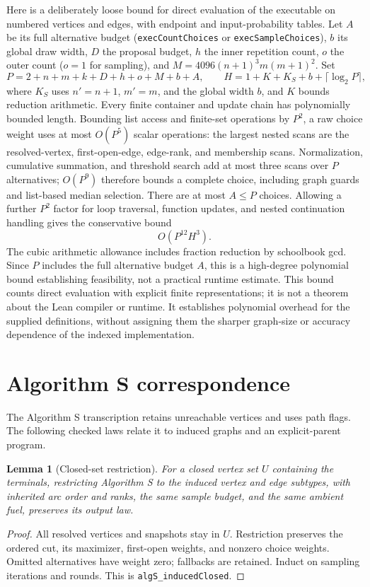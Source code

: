 \documentclass[11pt]{article}
\newtheorem{lemma}[theorem]{Lemma}
\begin{document}
Here is a deliberately loose bound for direct evaluation of the executable
on numbered vertices and edges, with endpoint and input-probability tables.
Let $A$ be its full alternative budget (\texttt{execCountChoices} or
\texttt{execSampleChoices}), $b$ its global draw width, $D$ the proposal
budget, $h$ the inner repetition count, $o$ the outer count ($o=1$ for
sampling), and $M=4096(n+1)^3m(m+1)^2$. Set
\[
 P=2+n+m+k+D+h+o+M+b+A,
 \qquad H=1+K+K_S+b+\lceil\log_2 P\rceil,
\]
where $K_S$ uses $n'=n+1$, $m'=m$, and the global width $b$, and $K$ bounds
reduction arithmetic.
Every finite container and update chain has polynomially bounded length.
Bounding list access and finite-set operations by $P^2$, a raw choice weight
uses at most $O(P^5)$ scalar operations: the largest nested scans are the
resolved-vertex, first-open-edge, edge-rank, and membership scans.
Normalization, cumulative summation, and threshold search add at most three
scans over $P$ alternatives; $O(P^9)$ therefore bounds a complete choice,
including graph guards and list-based median selection. There are at most
$A\leq P$ choices. Allowing a further $P^2$ factor for loop traversal,
function updates, and nested continuation handling gives the conservative
bound
\[
 O(P^{12}H^3).
\]
The cubic arithmetic allowance includes fraction reduction by schoolbook gcd.
Since $P$ includes the full alternative budget $A$, this is a high-degree
polynomial bound establishing feasibility, not a practical runtime estimate.
This bound counts direct evaluation with explicit finite representations;
it is not a theorem about the Lean compiler or runtime. It establishes
polynomial overhead for the supplied definitions, without assigning them
the sharper graph-size or accuracy dependence of the indexed implementation.

\section{Algorithm S correspondence}\label{app:formal}
The Algorithm S transcription retains unreachable vertices and uses path
flags. The following checked laws relate it to induced graphs and an
explicit-parent program.

\begin{lemma}[Closed-set restriction]
For a closed vertex set $U$ containing the terminals, restricting Algorithm S
to the induced vertex and edge subtypes, with inherited arc order and ranks,
the same sample budget, and the same ambient fuel, preserves its output law.
\end{lemma}
\begin{proof}
All resolved vertices and snapshots stay in $U$. Restriction preserves the
ordered cut, its maximizer, first-open weights, and nonzero choice weights.
Omitted alternatives have weight zero; fallbacks are retained. Induct on
sampling iterations and rounds. This is \texttt{algS\_inducedClosed}.
\end{proof}
\end{document}
